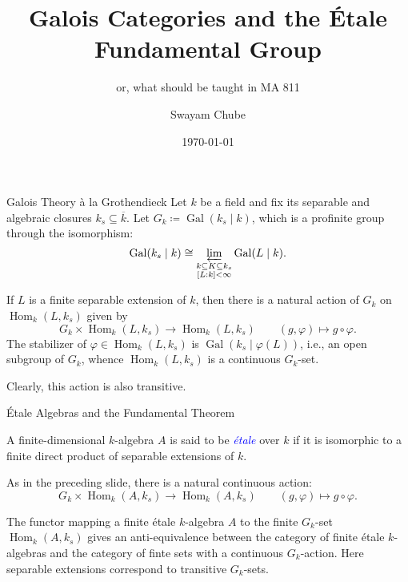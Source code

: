\documentclass{beamer}
\title{Galois Categories and the \'Etale Fundamental Group}
\subtitle{or, what should be taught in MA 811}
\author{Swayam Chube}
\institute{Indian Institute of Technology, Bombay}
\date{\today}
\newcommand{\Gal}{\operatorname{Gal}}
\newcommand{\Hom}{\operatorname{Hom}}
\newcommand{\define}[1]{\textcolor{blue}{\textit{#1}}}
\begin{document}
\maketitle

\begin{frame}{Galois Theory \`{a} la Grothendieck}
	Let $k$ be a field and fix its separable and algebraic closures $k_s\subseteq\overline k$. Let $G_k\coloneq\Gal(k_s\mid k)$, which is a profinite group through the isomorphism:
	\begin{equation*}
		\Gal(k_s\mid k)\cong\varprojlim_{\substack{k\subseteq K\subseteq k_s\\ [L : k] < \infty}}\Gal(L\mid k).
	\end{equation*}\pause

	If $L$ is a finite separable extension of $k$, then there is a natural action of $G_k$ on $\Hom_{k}(L, k_s)$ given by 
	\begin{equation*}
		G_k\times\Hom_{k}(L, k_s)\to\Hom_{k}(L, k_s)\qquad (g,\varphi)\mapsto g\circ\varphi.
	\end{equation*}\pause
	The stabilizer of $\varphi\in\Hom_k(L, k_s)$ is $\Gal(k_s\mid\varphi(L))$, i.e., an open subgroup of $G_k$, whence $\Hom_k(L, k_s)$ is a continuous $G_k$-set. \pause
	
	Clearly, this action is also transitive.
\end{frame}

\begin{frame}{\'Etale Algebras and the Fundamental Theorem}
	\begin{definition}
		A finite-dimensional $k$-algebra $A$ is said to be \define{\'etale} over $k$ if it is isomorphic to a finite direct product of separable extensions of $k$.
	\end{definition}\pause

	As in the preceding slide, there is a natural continuous action:
	\begin{equation*}
		G_k\times\Hom_{k}(A, k_s)\to\Hom_{k}(A, k_s)\qquad (g,\varphi)\mapsto g\circ\varphi.
	\end{equation*}\pause

	\begin{theorem}
		The functor mapping a finite \'etale $k$-algebra $A$ to the finite $G_k$-set $\Hom_k(A, k_s)$ gives an anti-equivalence between the category of finite \'etale $k$-algebras and the category of finte sets with a continuous $G_k$-action. Here separable extensions correspond to transitive $G_k$-sets.
	\end{theorem}
\end{frame}
\end{document}
